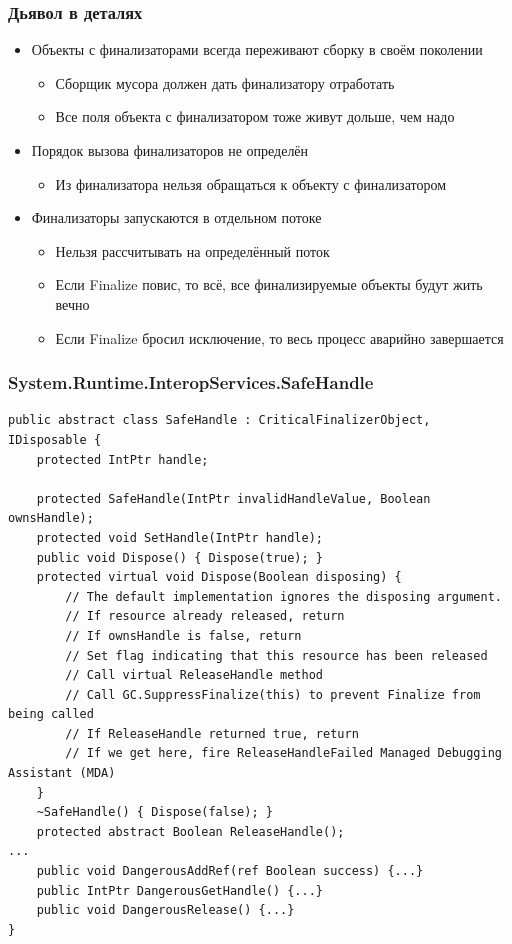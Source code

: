 \documentclass[xetex,mathserif,serif]{beamer}
\begin{document}
    \begin{frame}
        \frametitle{Дьявол в деталях}
        \begin{itemize}
            \item Объекты с финализаторами всегда переживают сборку в своём поколении
            \begin{itemize}
                \item Сборщик мусора должен дать финализатору отработать
                \item Все поля объекта с финализатором тоже живут дольше, чем надо
            \end{itemize}
            \item Порядок вызова финализаторов не определён
            \begin{itemize}
                \item Из финализатора нельзя обращаться к объекту с финализатором
            \end{itemize}
            \item Финализаторы запускаются в отдельном потоке
            \begin{itemize}
                \item Нельзя рассчитывать на определённый поток
                \item Если Finalize повис, то всё, все финализируемые объекты будут жить вечно
                \item Если Finalize бросил исключение, то весь процесс аварийно завершается
            \end{itemize}
        \end{itemize}
    \end{frame}

    \begin{frame}[fragile]
        \frametitle{System.Runtime.InteropServices.SafeHandle}
        \begin{scriptsize}
            \begin{verbatim}
public abstract class SafeHandle : CriticalFinalizerObject, IDisposable {
    protected IntPtr handle;

    protected SafeHandle(IntPtr invalidHandleValue, Boolean ownsHandle);
    protected void SetHandle(IntPtr handle);
    public void Dispose() { Dispose(true); }
    protected virtual void Dispose(Boolean disposing) {
        // The default implementation ignores the disposing argument.
        // If resource already released, return
        // If ownsHandle is false, return
        // Set flag indicating that this resource has been released
        // Call virtual ReleaseHandle method
        // Call GC.SuppressFinalize(this) to prevent Finalize from being called
        // If ReleaseHandle returned true, return
        // If we get here, fire ReleaseHandleFailed Managed Debugging Assistant (MDA)
    }
    ~SafeHandle() { Dispose(false); }
    protected abstract Boolean ReleaseHandle();
...
    public void DangerousAddRef(ref Boolean success) {...}
    public IntPtr DangerousGetHandle() {...}
    public void DangerousRelease() {...}
}
            \end{verbatim}
        \end{scriptsize}
    \end{frame}
\end{document}
